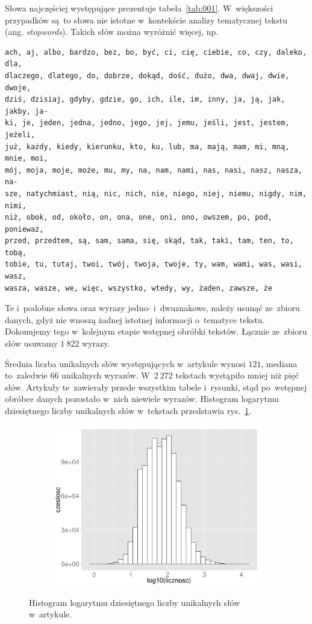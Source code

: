 \documentclass{praca1}
\begin{document}
Słowa najczęściej występujące prezentuje tabela~\ref{tab:001}. W~większości przypadków są~to słowa nie istotne w~kontekście analizy tematycznej tekstu (ang. \emph{stopwords}). Takich słów można wyróżnić więcej, np.
\begin{verbatim}
ach, aj, albo, bardzo, bez, bo, być, ci, cię, ciebie, co, czy, daleko, dla,
dlaczego, dlatego, do, dobrze, dokąd, dość, dużo, dwa, dwaj, dwie, dwoje, 
dziś, dzisiaj, gdyby, gdzie, go, ich, ile, im, inny, ja, ją, jak, jakby, ja-
ki, je, jeden, jedna, jedno, jego, jej, jemu, jeśli, jest, jestem, jeżeli, 
już, każdy, kiedy, kierunku, kto, ku, lub, ma, mają, mam, mi, mną, mnie, moi,
mój, moja, moje, może, mu, my, na, nam, nami, nas, nasi, nasz, nasza, na-
sze, natychmiast, nią, nic, nich, nie, niego, niej, niemu, nigdy, nim, nimi,
niż, obok, od, około, on, ona, one, oni, ono, owszem, po, pod, ponieważ, 
przed, przedtem, są, sam, sama, się, skąd, tak, taki, tam, ten, to, tobą, 
tobie, tu, tutaj, twoi, twój, twoja, twoje, ty, wam, wami, was, wasi, wasz, 
wasza, wasze, we, więc, wszystko, wtedy, wy, żaden, zawsze, że
\end{verbatim}

Te i~podobne słowa oraz wyrazy jedno- i~dwuznakowe, należy usunąć ze~zbioru danych, gdyż nie wnoszą żadnej istotnej informacji o~tematyce tekstu. Dokonujemy tego w~kolejnym etapie wstępnej obróbki tekstów. Łącznie ze~zbioru słów usuwamy $1\ 822$ wyrazy.

Średnia liczba unikalnych słów występujących w~artykule wynosi $121$, mediana to~zaledwie $66$ unikalnych wyrazów. W~$2\ 272$ tekstach wystąpiło mniej niż pięć słów. Artykuły te~zawierały przede wszystkim tabele i~rysunki, stąd po~wstępnej obróbce danych pozostało w~nich niewiele wyrazów. Histogram logarytmu dziesiętnego liczby unikalnych słów w~tekstach przedstawia rys.~\ref{plot:004}.

\begin{figure}[!h]
  \centering
  \includegraphics[width=350pt, height=200pt]{plot4.pdf}\\
  \caption{Histogram logarytmu dziesiętnego liczby unikalnych słów w~artykule.}\label{plot:004}
\end{figure}
\end{document}
